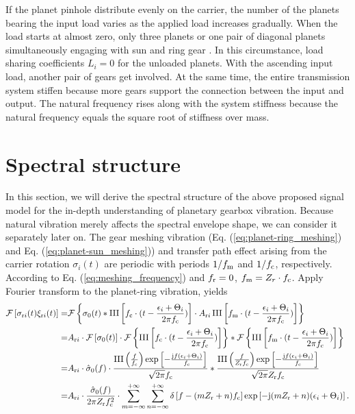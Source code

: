 \documentclass[a4paper,fleqn]{cas-sc}%
\begin{document}
\par If the planet pinhole distribute evenly on the carrier, the number of the planets bearing the input load varies as the applied load increases gradually. When the load starts at almost zero, only three planets or one pair of diagonal planets simultaneously engaging with sun and ring gear \cite{Ligata2009}. In this circumstance, load sharing coefficients $L_i=0$ for the unloaded planets. With the ascending input load, another pair of gears get involved. At the same time, the entire transmission system stiffen because more gears support the connection between the input and output. The natural frequency rises along with the system stiffness because the natural frequency equals the square root of stiffness over mass.
\section{Spectral structure}
\par In this section, we will derive the spectral structure of the above proposed signal model for the in-depth understanding of planetary gearbox vibration. Because natural vibration merely affects the spectral envelope shape, we can consider it separately later on. The gear meshing vibration (Eq. (\ref{eq:planet-ring_meshing}) and Eq. (\ref{eq:planet-sun_meshing})) and transfer path effect arising from the carrier rotation $\sigma_{i}(t)$ are periodic with periods $1/f_{\rm m}$ and $1/f_{\rm c}$, respectively. According to Eq. (\ref{eq:meshing_frequency}) and $f_{\rm r}=0$, $f_{\rm m}=Z_{r} \cdot f_{\rm c}$. Apply Fourier transform to the planet-ring vibration, yields
\begin{equation}
\begin{split}
    \mathcal{F}\left[ \sigma_{{\rm r}i}(t) \xi_{{\rm r}i}(t) \right]=&\mathcal{F}\left\{\sigma_0(t) \ast \operatorname{III}\left[f_{\rm c} \cdot (t - \frac{\epsilon_i+\Theta_i}{2 \pi f_{\rm c}})\right] \cdot A_{{\rm r}i}\operatorname{III}\left[f_{\rm m} \cdot (t-\frac{\epsilon_i+\Theta_i}{2 \pi f_{\rm c}})\right]\right\}\\
    =&A_{{\rm r}i} \cdot \mathcal{F}\left[\sigma_0(t)\right] \cdot \mathcal{F}\left\{\operatorname{III}\left[f_{\rm c} \cdot (t - \frac{\epsilon_i+\Theta_i}{2 \pi f_{\rm c}})\right] \right\}
    \ast \mathcal{F}\left\{ \operatorname{III}\left[f_{\rm m} \cdot (t-\frac{\epsilon_i+\Theta_i}{2 \pi f_{\rm c}})\right] \right\}\\
=&A_{{\rm r}i} \cdot \hat{\sigma}_0(f) \cdot \frac{\operatorname{III}\left(\frac{f}{f_{\rm c}}\right) \exp\left[-\frac{{\rm j} f (\epsilon_i+\Theta_i)}{f_{\rm c}}\right]}{\sqrt{2 \pi} f_{\rm c}} \ast \frac{\operatorname{III}\left(\frac{f}{ Z_{\rm r} f_{\rm c}}\right) \exp\left[-\frac{{\rm j} f (\epsilon_i+\Theta_i)}{ f_{\rm c}}\right]}{\sqrt{2 \pi } Z_{\rm r}f_{\rm c}}\\
=&A_{{\rm r}i} \cdot \frac{\hat{\sigma}_0(f)}{2 \pi Z_{\rm r} f_{\rm c}^{2}} \cdot \sum_{m=-\infty}^{+\infty} \sum_{n=-\infty}^{+\infty} \delta\left[f-(mZ_{\rm r}+n)f_{\rm c}\right] \exp\left[-{\rm j}(m Z_{\rm r}+n)(\epsilon_i+\Theta_i)\right].
\end{split}
\end{equation}
\end{document}
